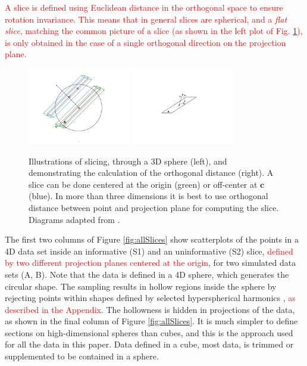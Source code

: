 \documentclass[]{interact}
\theoremstyle{plain}%
\theoremstyle{definition}
\theoremstyle{remark}
\begin{document}
\textcolor{red}{A slice is defined using Euclidean distance in the orthogonal space to ensure rotation invariance. This means that in general slices are spherical, and a \textit{flat slice}, matching the common picture of a slice (as shown in the left plot of Fig. \ref{fig:diagrams}), is only obtained in the case of a single orthogonal direction on the projection plane.}

\begin{figure}[ht]
\centerline{\includegraphics[width=0.4\textwidth]{diagrams/centered-slice.pdf}
\hspace{5mm}
\includegraphics[width=0.4\textwidth]{diagrams/orthogonal-distance.pdf}}
\caption{Illustrations of slicing, through a 3D sphere (left), and demonstrating the calculation of the orthogonal distance (right). A slice can be done centered at the origin (green) or off-center at $\mathbf{c}$ (blue). In more than three dimensions it is best to use orthogonal distance between point and projection plane for computing the slice. Diagrams adapted from \cite{laa2019slice}.}
\label{fig:diagrams}
\end{figure}

The first two columns of Figure \ref{fig:allSlices} show scatterplots of
the points in a 4D data set inside an informative (S1) and an
uninformative (S2) slice,
\textcolor{red}{defined by two different projection planes centered at the origin},
for two simulated data sets (A, B). Note that the data is defined in a
4D sphere, which generates the circular shape. The sampling results in
hollow regions inside the sphere by rejecting points within shapes
defined by selected hyperspherical harmonics
\citep{doi:10.1063/1.3054274},
\textcolor{red}{as described in the Appendix}. The hollowness is hidden
in projections of the data, as shown in the final column of Figure
\ref{fig:allSlices}. It is much simpler to define sections on
high-dimensional spheres than cubes, and this is the approach used for
all the data in this paper. Data defined in a cube, most data, is
trimmed or supplemented to be contained in a sphere.
\end{document}
